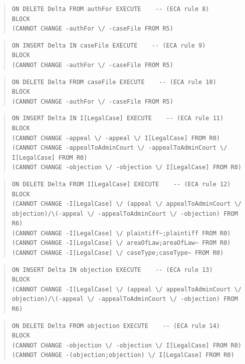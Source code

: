 \documentclass[10pt,a4paper]{report}              %
\theoremstyle{plain}\theorembodyfont{\rmfamily}\newtheorem{definition}{Definition}[section]
\theoremstyle{plain}\theorembodyfont{\rmfamily}\newtheorem{designrule}[definition]{Requirement}
\begin{document}
\begin{quote}
\begin{verbatim}
ON DELETE Delta FROM authFor EXECUTE    -- (ECA rule 8)
BLOCK
(CANNOT CHANGE -authFor \/ -caseFile FROM R5)
\end{verbatim}
\end{quote}
\begin{quote}
\begin{verbatim}
ON INSERT Delta IN caseFile EXECUTE    -- (ECA rule 9)
BLOCK
(CANNOT CHANGE -authFor \/ -caseFile FROM R5)
\end{verbatim}
\end{quote}
\begin{quote}
\begin{verbatim}
ON DELETE Delta FROM caseFile EXECUTE    -- (ECA rule 10)
BLOCK
(CANNOT CHANGE -authFor \/ -caseFile FROM R5)
\end{verbatim}
\end{quote}
\begin{quote}
\begin{verbatim}
ON INSERT Delta IN I[LegalCase] EXECUTE    -- (ECA rule 11)
BLOCK
(CANNOT CHANGE -appeal \/ -appeal \/ I[LegalCase] FROM R0)
(CANNOT CHANGE -appealToAdminCourt \/ -appealToAdminCourt \/ I[LegalCase] FROM R0)
(CANNOT CHANGE -objection \/ -objection \/ I[LegalCase] FROM R0)
\end{verbatim}
\end{quote}
\begin{quote}
\begin{verbatim}
ON DELETE Delta FROM I[LegalCase] EXECUTE    -- (ECA rule 12)
BLOCK
(CANNOT CHANGE -I[LegalCase] \/ (appeal \/ appealToAdminCourt \/ objection)/\(-appeal \/ -appealToAdminCourt \/ -objection) FROM R6)
(CANNOT CHANGE -I[LegalCase] \/ plaintiff~;plaintiff FROM R0)
(CANNOT CHANGE -I[LegalCase] \/ areaOfLaw;areaOfLaw~ FROM R0)
(CANNOT CHANGE -I[LegalCase] \/ caseType;caseType~ FROM R0)
\end{verbatim}
\end{quote}
\begin{quote}
\begin{verbatim}
ON INSERT Delta IN objection EXECUTE    -- (ECA rule 13)
BLOCK
(CANNOT CHANGE -I[LegalCase] \/ (appeal \/ appealToAdminCourt \/ objection)/\(-appeal \/ -appealToAdminCourt \/ -objection) FROM R6)
\end{verbatim}
\end{quote}
\begin{quote}
\begin{verbatim}
ON DELETE Delta FROM objection EXECUTE    -- (ECA rule 14)
BLOCK
(CANNOT CHANGE -objection \/ -objection \/ I[LegalCase] FROM R0)
(CANNOT CHANGE -(objection;objection) \/ I[LegalCase] FROM R0)
\end{verbatim}
\end{quote}
\end{document}
